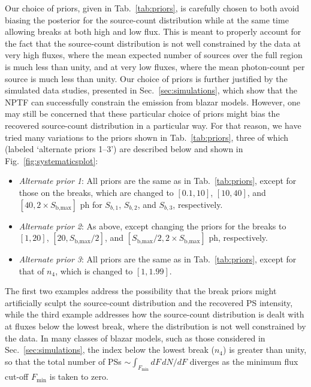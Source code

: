Our choice of priors, given in Tab.~\ref{tab:priors}, is carefully chosen to both avoid biasing the posterior for the source-count distribution while at the same time allowing breaks at both high and low flux.  This is meant to properly account for the fact that the source-count distribution is not well constrained by the data at very high fluxes, where the mean expected number of sources over the full region is much less than unity, and at very low fluxes, where the mean photon-count per source is much less than unity.  Our choice of priors is further justified by the simulated data studies, presented in Sec.~\ref{sec:simulations}, which show that the NPTF can successfully constrain the emission from blazar models.  However, one may still be concerned that these particular choice of priors might bias the recovered source-count distribution in a particular way.  For that reason, we have tried many variations to the priors shown in Tab.~\ref{tab:priors}, three of which (labeled `alternate priors 1--3')  are described below and shown in Fig.~\ref{fig:systematicsplot}:
\begin{itemize}
\item {\it Alternate prior 1}:  All priors are the same as in Tab.~\ref{tab:priors}, except for those on the breaks, which are changed to $[0.1,10]$, $[10,40]$, and $[40, 2 \times S_\text{b,max}]$ ph for $S_{b,1}$, $S_{b,2}$, and $S_{b,3}$, respectively. 
\item {\it Alternate prior 2}:  As above, except changing the priors for the breaks to $[1,20]$, $[20,S_\text{b,max}/2]$, and $[S_\text{b,max}/2, 2 \times S_\text{b,max}]$ ph, respectively.
\item {\it Alternate prior 3}:  All priors are the same as in Tab.~\ref{tab:priors}, except for that of $n_4$, which is changed to $[1,1.99]$.
\end{itemize}

The first two examples address the possibility that the break priors might artificially sculpt the source-count distribution and the recovered PS intensity, while the third example addresses how the source-count distribution is dealt with at fluxes below the lowest break, where the distribution is not well constrained by the data.  In many classes of blazar models, such as those considered in Sec.~\ref{sec:simulations}, the index below the lowest break ($n_4$) is greater than unity, so that the total number of PSs $\sim$$\int_{F_\text{min}} dF \, dN / dF$ diverges as the minimum flux cut-off $F_\text{min}$ is taken to zero.

